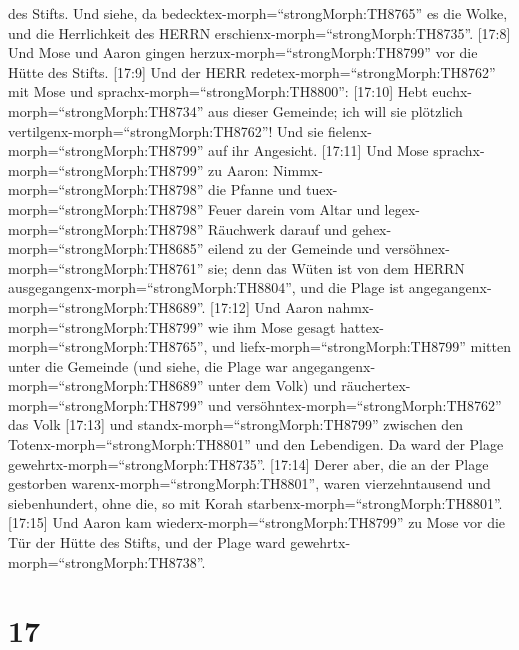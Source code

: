 des Stifts. Und siehe, da bedecktex-morph=``strongMorph:TH8765'' es die
Wolke, und die Herrlichkeit des HERRN
erschienx-morph=``strongMorph:TH8735''.  {[}17:8{]} Und
Mose und Aaron gingen herzux-morph=``strongMorph:TH8799'' vor die Hütte
des Stifts.  {[}17:9{]} Und der HERR
redetex-morph=``strongMorph:TH8762'' mit Mose und
sprachx-morph=``strongMorph:TH8800'':  {[}17:10{]} Hebt
euchx-morph=``strongMorph:TH8734'' aus dieser Gemeinde; ich will sie
plötzlich vertilgenx-morph=``strongMorph:TH8762''! Und sie
fielenx-morph=``strongMorph:TH8799'' auf ihr Angesicht. 
{[}17:11{]} Und Mose sprachx-morph=``strongMorph:TH8799'' zu Aaron:
Nimmx-morph=``strongMorph:TH8798'' die Pfanne und
tuex-morph=``strongMorph:TH8798'' Feuer darein vom Altar und
legex-morph=``strongMorph:TH8798'' Räuchwerk darauf und
gehex-morph=``strongMorph:TH8685'' eilend zu der Gemeinde und
versöhnex-morph=``strongMorph:TH8761'' sie; denn das Wüten ist von dem
HERRN ausgegangenx-morph=``strongMorph:TH8804'', und die Plage ist
angegangenx-morph=``strongMorph:TH8689''.  {[}17:12{]} Und
Aaron nahmx-morph=``strongMorph:TH8799'' wie ihm Mose gesagt
hattex-morph=``strongMorph:TH8765'', und
liefx-morph=``strongMorph:TH8799'' mitten unter die Gemeinde (und siehe,
die Plage war angegangenx-morph=``strongMorph:TH8689'' unter dem Volk)
und räuchertex-morph=``strongMorph:TH8799'' und
versöhntex-morph=``strongMorph:TH8762'' das Volk 
{[}17:13{]} und standx-morph=``strongMorph:TH8799'' zwischen den
Totenx-morph=``strongMorph:TH8801'' und den Lebendigen. Da ward der
Plage gewehrtx-morph=``strongMorph:TH8735''.  {[}17:14{]}
Derer aber, die an der Plage gestorben
warenx-morph=``strongMorph:TH8801'', waren vierzehntausend und
siebenhundert, ohne die, so mit Korah
starbenx-morph=``strongMorph:TH8801''.  {[}17:15{]} Und
Aaron kam wiederx-morph=``strongMorph:TH8799'' zu Mose vor die Tür der
Hütte des Stifts, und der Plage ward
gewehrtx-morph=``strongMorph:TH8738''.

\hypertarget{section-16}{%
\section{17}\label{section-16}}


